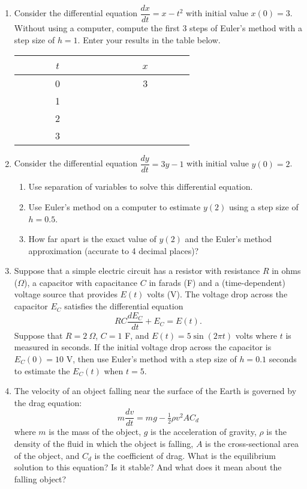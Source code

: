 \documentclass[10pt]{article}
\begin{document}
\begin{enumerate}
\item Consider the differential equation $\dfrac{dx}{dt} = x - t^2$ with initial value $x(0) = 3$.  Without using a computer, compute the first 3 steps of Euler's method with a step size of $h = 1$.  Enter your results in the table below. 

\renewcommand{\arraystretch}{1.5}
\begin{tabular}{|c|c|}
\hline
~~~~~~ $t$ ~~~~~~ & ~~~~~~ $x$ ~~~~~~ \\ \hline
0 & 3 \\ \hline
1 &   \\ \hline
2 &   \\ \hline
3 &   \\ \hline
\end{tabular}

\bigskip
\bigskip


\item Consider the differential equation $\dfrac{dy}{dt} = 3y - 1$ with initial value $y(0) = 2$.  
\begin{enumerate}
\item Use separation of variables to solve this differential equation.
\vfill


\item Use Euler's method on a computer to estimate $y(2)$ using a step size of $h = 0.5$.  
\bigskip
\bigskip


\item How far apart is the exact value of $y(2)$ and the Euler's method approximation (accurate to 4 decimal places)?
\vspace*{1.0in}
\end{enumerate}


\newpage
\item Suppose that a simple electric circuit has a resistor with resistance $R$ in ohms ($\Omega$), a capacitor with capacitance $C$ in farads (F) and a (time-dependent) voltage source that provides $E(t)$ volts (V).  The voltage drop across the capacitor $E_C$ satisfies the differential equation
$$RC \dfrac{dE_C}{dt} + E_C = E(t).$$
Suppose that  $R = 2~\Omega$, $C = 1$ F, and $E(t) = 5 \sin (2 \pi t)$ volts where $t$ is measured in seconds. If the initial voltage drop across the capacitor is $E_C(0) = 10$ V, then use Euler's method with a step size of $h = 0.1$ seconds to estimate the $E_C(t)$ when $t = 5$.  
\vfill

\item The velocity of an object falling near the surface of the Earth is governed by the drag equation:
$$m \dfrac{dv}{dt} = mg - \tfrac{1}{2} \rho v^2 A C_d$$
where $m$ is the mass of the object, $g$ is the acceleration of gravity, $\rho$ is the density of the fluid in which the object is falling, $A$ is the cross-sectional area of the object, and $C_d$ is the coefficient of drag.  What is the equilibrium solution to this equation? Is it stable?  And what does it mean about the falling object?  
\vfill



\end{enumerate}
\end{document}
